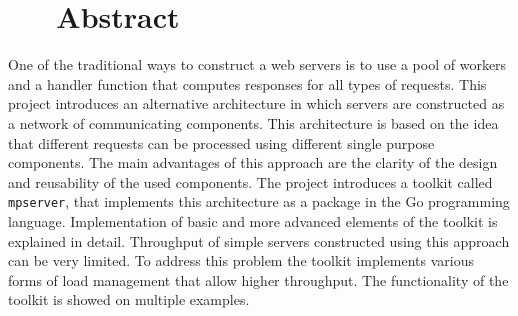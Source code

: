 \section*{\hfil \ \ \ Abstract \hfil}
One of the traditional ways to construct a web servers is to use
a pool of workers and a handler function that computes responses
for all types of requests.
This project introduces an alternative architecture in which 
servers are constructed as a network of communicating components.
This architecture is based on the idea that different requests 
can be processed using different single purpose components.
The main advantages of this approach are the clarity of the design 
and reusability of the used components. The project introduces a toolkit 
called \texttt{mpserver}, that implements this architecture as a 
package in the Go programming language. Implementation of basic and 
more advanced elements of the toolkit is explained in detail. 
Throughput of simple servers constructed using this approach can
be very limited. To address this problem the toolkit implements 
various forms of load management that allow higher throughput. 
The functionality of the toolkit is showed on multiple examples.